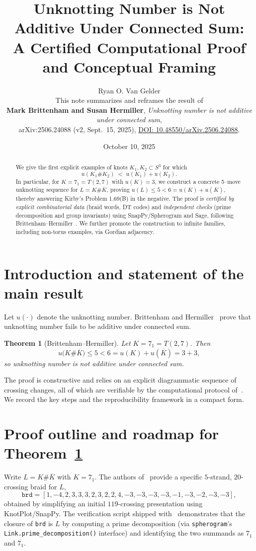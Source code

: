 \documentclass[11pt]{article}
\title{\vspace{-1em}
Unknotting Number is Not Additive Under Connected Sum:\\
A Certified Computational Proof and Conceptual Framing
\vspace{-.5em}}
\author{Ryan O. Van Gelder \\
\small This note summarizes and reframes the result of\\[-.25em]
\small \textbf{Mark Brittenham and Susan Hermiller}, \emph{Unknotting number is not additive under connected sum},\\[-.25em]
\small arXiv:2506.24088 (v2, Sept.\ 15, 2025), \href{https://doi.org/10.48550/arXiv.2506.24088}{DOI: 10.48550/arXiv.2506.24088}.}
\date{\small October 10, 2025}
\theoremstyle{plain}
\newtheorem{theorem}{Theorem}
\theoremstyle{remark}
\begin{document}
\maketitle

\begin{abstract}
We give the first explicit examples of knots \(K_1,K_2\subset S^3\) for which
\[
u(K_1\#K_2)\;<\;u(K_1)+u(K_2).
\]
In particular, for \(K=7_1=T(2,7)\) with \(u(K)=3\), we construct a concrete 5--move unknotting sequence for \(L=K\#\overline K\), proving \(u(L)\le5<6=u(K)+u(\overline K)\), thereby answering Kirby’s Problem 1.69(B) in the negative. The proof is \emph{certified by explicit combinatorial data} (braid words, DT codes) and \emph{independent checks} (prime decomposition and group invariants) using SnapPy/Spherogram and Sage, following Brittenham--Hermiller~\cite{BH25}. We further promote the construction to infinite families, including non-torus examples, via Gordian adjacency.
\end{abstract}

\section{Introduction and statement of the main result}
Let \(u(\cdot)\) denote the unknotting number. Brittenham and Hermiller~\cite{BH25} prove that unknotting number fails to be additive under connected sum.

\begin{theorem}[Brittenham--Hermiller]
\label{thm:main}
Let \(K=7_1=T(2,7)\). Then
\[
u\bigl(K\#\overline K\bigr)\le5<6=u(K)+u(\overline K)=3+3,
\]
so unknotting number is not additive under connected sum.
\end{theorem}

The proof is constructive and relies on an explicit diagrammatic sequence of crossing changes, all of which are verifiable by the computational protocol of~\cite{BH25}. We record the key steps and the reproducibility framework in a compact form.

\section{Proof outline and roadmap for Theorem~\ref{thm:main}}
Write \(L=K\#\overline K\) with \(K=7_1\). The authors of~\cite{BH25} provide a specific \(5\)-strand, \(20\)-crossing braid for \(L\),
\[
\texttt{brd}=[1,-4,2,3,3,3,2,3,2,2,4,-3,-3,-3,-3,-1,-3,-2,-3,-3],
\]
obtained by simplifying an initial \(119\)-crossing presentation using KnotPlot/SnapPy. The verification script shipped with~\cite{BH25} demonstrates that the closure of \texttt{brd} is \(L\) by computing a prime decomposition (via \texttt{spherogram}'s \texttt{Link.prime\_decomposition()} interface) and identifying the two summands as \(7_1\) and \(\overline{7_1}\).
\end{document}
